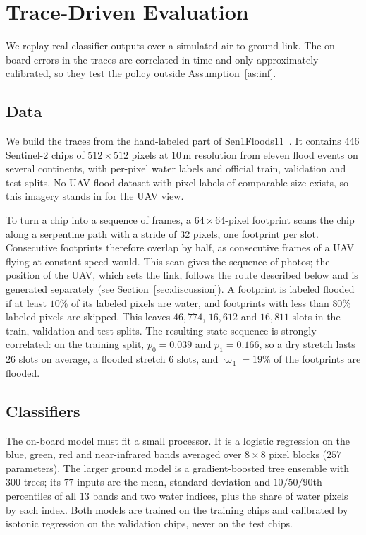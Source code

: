 \documentclass[10pt,journal,compsoc]{IEEEtran}
\theoremstyle{remark}
\begin{document}
\section{Trace-Driven Evaluation}\label{sec:results}
We replay real classifier outputs over a simulated air-to-ground link. The on-board errors in the traces are correlated in time and only approximately calibrated, so they test the policy outside Assumption~\ref{as:inf}.

\subsection{Data}
We build the traces from the hand-labeled part of Sen1Floods11~\cite{bonafilia2020sen1floods11}. It contains 446 Sentinel-2 chips of $512\times512$ pixels at $10$\,m resolution from eleven flood events on several continents, with per-pixel water labels and official train, validation and test splits. No UAV flood dataset with pixel labels of comparable size exists, so this imagery stands in for the UAV view.

To turn a chip into a sequence of frames, a $64\times64$-pixel footprint scans the chip along a serpentine path with a stride of $32$ pixels, one footprint per slot. Consecutive footprints therefore overlap by half, as consecutive frames of a UAV flying at constant speed would. This scan gives the sequence of photos; the position of the UAV, which sets the link, follows the route described below and is generated separately (see Section~\ref{sec:discussion}). A footprint is labeled flooded if at least $10\%$ of its labeled pixels are water, and footprints with less than $80\%$ labeled pixels are skipped. This leaves $46{,}774$, $16{,}612$ and $16{,}811$ slots in the train, validation and test splits. The resulting state sequence is strongly correlated: on the training split, $p_0=0.039$ and $p_1=0.166$, so a dry stretch lasts $26$ slots on average, a flooded stretch $6$ slots, and $\varpi_1=19\%$ of the footprints are flooded.

\subsection{Classifiers}\label{res:cls}
The on-board model must fit a small processor. It is a logistic regression on the blue, green, red and near-infrared bands averaged over $8\times8$ pixel blocks ($257$ parameters). The larger ground model is a gradient-boosted tree ensemble with $300$ trees; its $77$ inputs are the mean, standard deviation and $10/50/90$th percentiles of all $13$ bands and two water indices, plus the share of water pixels by each index. Both models are trained on the training chips and calibrated by isotonic regression on the validation chips, never on the test chips.
\end{document}
